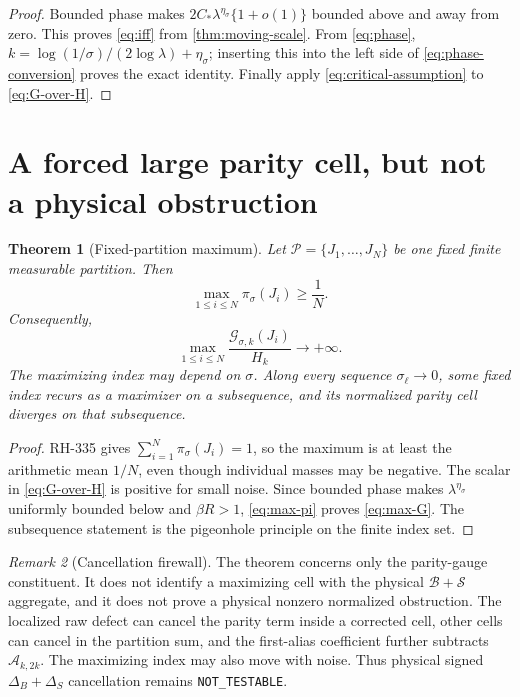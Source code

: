 \documentclass[11pt]{article}
\newtheorem{theorem}{Theorem}[section]
\theoremstyle{remark}
\newtheorem{remark}[theorem]{Remark}
\newcommand{\cB}{\mathcal B}
\newcommand{\cG}{\mathcal G}
\newcommand{\cP}{\mathcal P}
\newcommand{\cS}{\mathcal S}
\begin{document}
\begin{proof}
Bounded phase makes $2C_*\lambda^{\eta_\sigma}\{1+o(1)\}$ bounded above
and away from zero.  This proves \eqref{eq:iff} from
\cref{thm:moving-scale}.  From \eqref{eq:phase},
$k=\log(1/\sigma)/(2\log\lambda)+\eta_\sigma$; inserting this into the
left side of \eqref{eq:phase-conversion} proves the exact identity.
Finally apply \eqref{eq:critical-assumption} to \eqref{eq:G-over-H}.
\end{proof}

\section{A forced large parity cell, but not a physical obstruction}

\begin{theorem}[Fixed-partition maximum]
\label{thm:partition-max}
Let $\cP=\{J_1,\ldots,J_N\}$ be one fixed finite measurable partition.
Then
\begin{equation}\label{eq:max-pi}
 \max_{1\le i\le N}\pi_\sigma(J_i)\ge\frac1N.
\end{equation}
Consequently,
\begin{equation}\label{eq:max-G}
 \max_{1\le i\le N}
 \frac{\cG_{\sigma,k}(J_i)}{H_k}\longrightarrow+\infty.
\end{equation}
The maximizing index may depend on $\sigma$.  Along every sequence
$\sigma_\ell\to0$, some fixed index recurs as a maximizer on a subsequence,
and its normalized parity cell diverges on that subsequence.
\end{theorem}

\begin{proof}
RH-335 gives
$\sum_{i=1}^N\pi_\sigma(J_i)=1$, so the maximum is at least the arithmetic
mean $1/N$, even though individual masses may be negative.  The scalar in
\eqref{eq:G-over-H} is positive for small noise.  Since bounded phase makes
$\lambda^{\eta_\sigma}$ uniformly bounded below and $\beta R>1$,
\eqref{eq:max-pi} proves \eqref{eq:max-G}.  The subsequence statement is the
pigeonhole principle on the finite index set.
\end{proof}

\begin{remark}[Cancellation firewall]
The theorem concerns only the parity-gauge constituent.  It does not
identify a maximizing cell with the physical $\cB+\cS$ aggregate, and it
does not prove a physical nonzero normalized obstruction.  The localized
raw defect can cancel the parity term inside a corrected cell, other cells
can cancel in the partition sum, and the first-alias coefficient further
subtracts $\mathcal A_{k,2k}$.  The maximizing index may also move with
noise.  Thus physical signed $\Delta_B+\Delta_S$ cancellation remains
\texttt{NOT\_TESTABLE}.
\end{remark}
\end{document}

